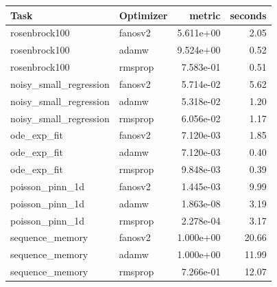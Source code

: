 \begin{tabular}{llrr}
\toprule
Task & Optimizer & metric & seconds \\
\midrule
rosenbrock100 & fanosv2 & 5.611e+00 & 2.05 \\
rosenbrock100 & adamw & 9.524e+00 & 0.52 \\
rosenbrock100 & rmsprop & 7.583e-01 & 0.51 \\
noisy\_small\_regression & fanosv2 & 5.714e-02 & 5.62 \\
noisy\_small\_regression & adamw & 5.318e-02 & 1.20 \\
noisy\_small\_regression & rmsprop & 6.056e-02 & 1.17 \\
ode\_exp\_fit & fanosv2 & 7.120e-03 & 1.85 \\
ode\_exp\_fit & adamw & 7.120e-03 & 0.40 \\
ode\_exp\_fit & rmsprop & 9.848e-03 & 0.39 \\
poisson\_pinn\_1d & fanosv2 & 1.445e-03 & 9.99 \\
poisson\_pinn\_1d & adamw & 1.863e-08 & 3.19 \\
poisson\_pinn\_1d & rmsprop & 2.278e-04 & 3.17 \\
sequence\_memory & fanosv2 & 1.000e+00 & 20.66 \\
sequence\_memory & adamw & 1.000e+00 & 11.99 \\
sequence\_memory & rmsprop & 7.266e-01 & 12.07 \\
\bottomrule
\end{tabular}
